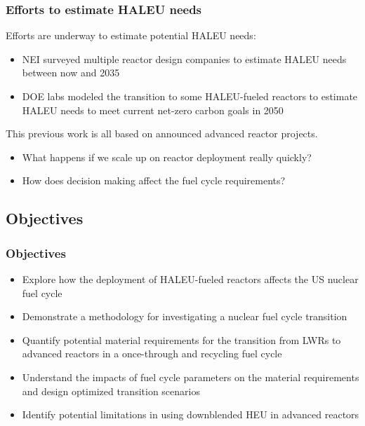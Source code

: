 \begin{frame}
    \frametitle{Efforts to estimate HALEU needs}
    Efforts are underway to estimate potential \gls{HALEU} needs:
    \begin{itemize}
        \item \gls{NEI} surveyed multiple reactor design companies
              to estimate \gls{HALEU} needs between now and 2035 
              \cite{korsnick_updated_2021,nuclear_energy_institute_establishing_2022}
        \item \gls{DOE} labs modeled the transition to some 
              \gls{HALEU}-fueled reactors to estimate \gls{HALEU} needs 
              to meet current net-zero carbon goals in 2050 \cite{dixon_estimated_2022}
    \end{itemize}
    \pause
    This previous work is all based on announced advanced reactor projects.
    \begin{itemize}
        \item What happens if we scale up on reactor deployment really quickly?
        \item How does decision making affect the fuel cycle requirements?
    \end{itemize}
\end{frame}

\subsection{Objectives}
\begin{frame}
    \frametitle{Objectives}
        \begin{itemize}
        \item Explore how the deployment of \gls{HALEU}-fueled reactors 
              affects the US nuclear fuel cycle 
        \item Demonstrate a methodology for investigating a nuclear 
              fuel cycle transition 
        \item Quantify potential material requirements for the transition from 
              \glspl{LWR} to advanced reactors in a once-through and recycling 
              fuel cycle
        \item Understand the impacts of fuel cycle parameters on the 
              material requirements and design optimized transition scenarios
        \item Identify potential limitations in using downblended \gls{HEU} 
              in advanced reactors
        \end{itemize}
\end{frame}